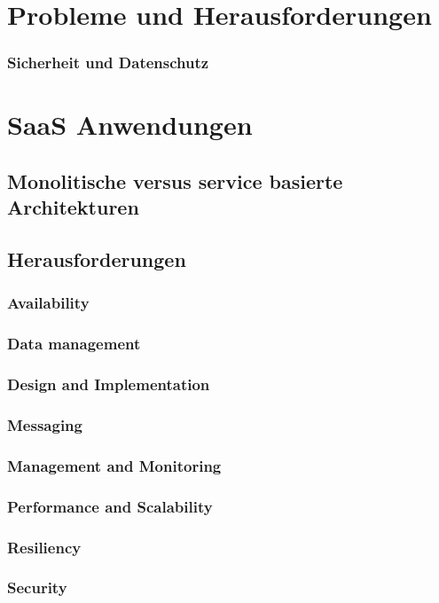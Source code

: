 \section{Probleme und Herausforderungen}
\subsubsection{Sicherheit und Datenschutz}

\section{SaaS Anwendungen}
\subsection{Monolitische versus service basierte Architekturen}
\subsection{Herausforderungen}
\subsubsection{Availability}
\subsubsection{Data management}
\subsubsection{Design and Implementation}
\subsubsection{Messaging}
\subsubsection{Management and Monitoring}
\subsubsection{Performance and Scalability}
\subsubsection{Resiliency}
\subsubsection{Security}


